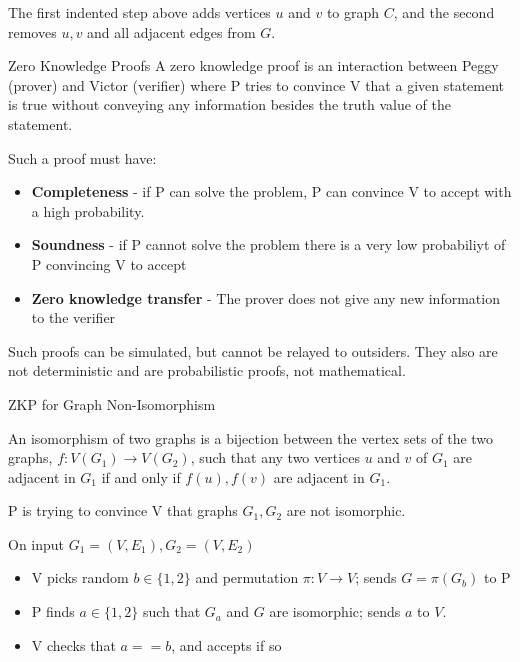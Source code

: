 \documentclass[2pt]{scrartcl}
\makeatletter
\renewcommand{\section}{\@startsection{section}{1}{0mm}
  {-1ex plus -.5ex minus -.2ex}
  {0.5ex plus .2ex}
{\normalfont\large\bfseries}}
\renewcommand{\subsection}{\@startsection{subsection}{2}{0mm}
  {-1explus -.5ex minus -.2ex}
  {0.5ex plus .2ex}
{\normalfont\normalsize\bfseries}}
\makeatother
\begin{document}
\begin{multicols}{6}
  The first indented step above adds vertices $u$ and $v$ to graph $C$, and the second removes $u, v$ and all adjacent edges from $G$.

  \section{Zero Knowledge Proofs}
  A zero knowledge proof is an interaction between Peggy (prover) and Victor (verifier) where P tries to convince V that a given statement is true without conveying any information besides the truth value of the statement.

  Such a proof must have:

  \begin{itemize}
    \item {\bf Completeness} - if P can solve the problem, P can convince V to accept with a high probability.
    \item {\bf Soundness} - if P cannot solve the problem there is a very low probabiliyt of P convincing V to accept
    \item {\bf Zero knowledge transfer} - The prover does not give any new information to the verifier
  \end{itemize}

  Such proofs can be simulated, but cannot be relayed to outsiders. They also are not deterministic and are probabilistic proofs, not mathematical.

  \subsection{ZKP for Graph Non-Isomorphism}

  An isomorphism of two graphs is a bijection between the vertex sets of the two graphs, $f: V(G_1) \rightarrow V(G_2)$, such that any two vertices $u$ and $v$ of $G_1$ are adjacent in $G_1$ if and only if $f(u), f(v)$ are adjacent in $G_1$.

  P is trying to convince V that graphs $G_1, G_2$ are not isomorphic.

  On input $G_1 = (V, E_1), G_2 = (V, E_2)$ 
  \begin{itemize}
    \item V picks random $b \in \{1, 2\}$ and permutation $\pi: V \rightarrow V$; sends $G = \pi(G_b)$ to P
    \item P finds $a \in \{1, 2\}$ such that $G_a$ and $G$ are isomorphic; sends $a$ to $V$.
    \item V checks that $a == b$, and accepts if so
  \end{itemize}


\end{multicols}
\end{document}
